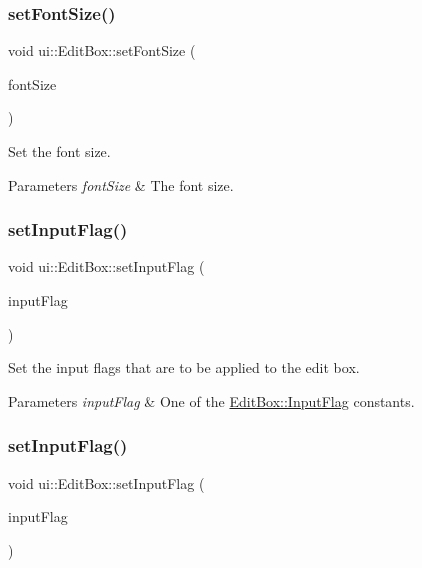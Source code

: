 \subsubsection{\texorpdfstring{set\+Font\+Size()}{setFontSize()}\hspace{0.1cm}{\footnotesize\ttfamily [2/2]}}
{\footnotesize\ttfamily void ui\+::\+Edit\+Box\+::set\+Font\+Size (\begin{DoxyParamCaption}\item[{int}]{font\+Size }\end{DoxyParamCaption})}

Set the font size. 
\begin{DoxyParams}{Parameters}
{\em font\+Size} & The font size. \\
\hline
\end{DoxyParams}
\mbox{\label{classui_1_1EditBox_ab76860616e5d9d7b1601e2a203a8c82a}} 
\subsubsection{\texorpdfstring{set\+Input\+Flag()}{setInputFlag()}\hspace{0.1cm}{\footnotesize\ttfamily [1/2]}}
{\footnotesize\ttfamily void ui\+::\+Edit\+Box\+::set\+Input\+Flag (\begin{DoxyParamCaption}\item[{\hyperlink{classui_1_1EditBox_af02f13ee9fba51d59bb3111e200848c8}{Edit\+Box\+::\+Input\+Flag}}]{input\+Flag }\end{DoxyParamCaption})}

Set the input flags that are to be applied to the edit box. 
\begin{DoxyParams}{Parameters}
{\em input\+Flag} & One of the \hyperlink{classui_1_1EditBox_af02f13ee9fba51d59bb3111e200848c8}{Edit\+Box\+::\+Input\+Flag} constants. \\
\hline
\end{DoxyParams}
\mbox{\label{classui_1_1EditBox_ab76860616e5d9d7b1601e2a203a8c82a}} 
\subsubsection{\texorpdfstring{set\+Input\+Flag()}{setInputFlag()}\hspace{0.1cm}{\footnotesize\ttfamily [2/2]}}
{\footnotesize\ttfamily void ui\+::\+Edit\+Box\+::set\+Input\+Flag (\begin{DoxyParamCaption}\item[{\hyperlink{classui_1_1EditBox_af02f13ee9fba51d59bb3111e200848c8}{Input\+Flag}}]{input\+Flag }\end{DoxyParamCaption})}

